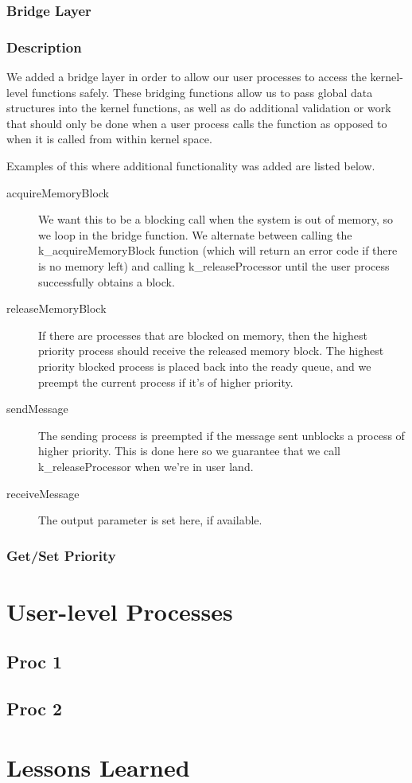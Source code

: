 \documentclass[12pt]{report}
\begin{document}
\section{Bridge Layer}

\section{Description}
    We added a bridge layer in order to allow our user processes to access the
    kernel-level functions safely.  These bridging functions allow us to pass
    global data structures into the kernel functions, as well as do additional
    validation or work that should only be done when a user process calls the
    function as opposed to when it is called from within kernel space.

    Examples of this where additional functionality was added are listed below.

    \begin{description}
        \item [acquireMemoryBlock] We want this to be a blocking call when
            the system is out of memory, so we loop in the bridge function.  We
            alternate between calling the k\_acquireMemoryBlock function (which
            will return an error code if there is no memory left) and calling
            k\_releaseProcessor until the user process successfully obtains a
            block.
        \item [releaseMemoryBlock] If there are processes that are blocked on
            memory, then the highest priority process should receive the
            released memory block.  The highest priority blocked process is
            placed back into the ready queue, and we preempt the current process
            if it's of higher priority.
        \item [sendMessage] The sending process is preempted if the message sent
            unblocks a process of higher priority.  This is done here so we
            guarantee that we call k\_releaseProcessor when we're in user land.
        \item [receiveMessage] The output parameter is set here, if available.
    \end{description}

\section{Get/Set Priority}

\part{User-level Processes}

\chapter{Proc 1}

\chapter{Proc 2}

\part{Lessons Learned}
\end{document}
